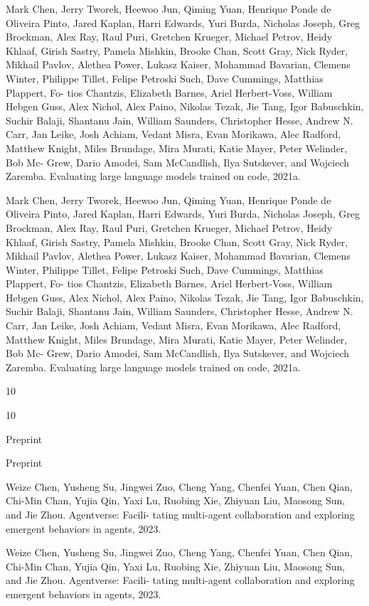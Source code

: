 \documentclass[12pt]{article}
\begin{document}
Mark Chen, Jerry Tworek, Heewoo Jun, Qiming Yuan, Henrique Ponde de Oliveira Pinto, Jared
Kaplan, Harri Edwards, Yuri Burda, Nicholas Joseph, Greg Brockman, Alex Ray, Raul Puri,
Gretchen Krueger, Michael Petrov, Heidy Khlaaf, Girish Sastry, Pamela Mishkin, Brooke Chan,
Scott Gray, Nick Ryder, Mikhail Pavlov, Alethea Power, Lukasz Kaiser, Mohammad Bavarian,
Clemens Winter, Philippe Tillet, Felipe Petroski Such, Dave Cummings, Matthias Plappert, Fo-
tios Chantzis, Elizabeth Barnes, Ariel Herbert-Voss, William Hebgen Guss, Alex Nichol, Alex
Paino, Nikolas Tezak, Jie Tang, Igor Babuschkin, Suchir Balaji, Shantanu Jain, William Saunders,
Christopher Hesse, Andrew N. Carr, Jan Leike, Josh Achiam, Vedant Misra, Evan Morikawa, Alec
Radford, Matthew Knight, Miles Brundage, Mira Murati, Katie Mayer, Peter Welinder, Bob Mc-
Grew, Dario Amodei, Sam McCandlish, Ilya Sutskever, and Wojciech Zaremba. Evaluating large
language models trained on code, 2021a.


Mark Chen, Jerry Tworek, Heewoo Jun, Qiming Yuan, Henrique Ponde de Oliveira Pinto, Jared
Kaplan, Harri Edwards, Yuri Burda, Nicholas Joseph, Greg Brockman, Alex Ray, Raul Puri,
Gretchen Krueger, Michael Petrov, Heidy Khlaaf, Girish Sastry, Pamela Mishkin, Brooke Chan,
Scott Gray, Nick Ryder, Mikhail Pavlov, Alethea Power, Lukasz Kaiser, Mohammad Bavarian,
Clemens Winter, Philippe Tillet, Felipe Petroski Such, Dave Cummings, Matthias Plappert, Fo-
tios Chantzis, Elizabeth Barnes, Ariel Herbert-Voss, William Hebgen Guss, Alex Nichol, Alex
Paino, Nikolas Tezak, Jie Tang, Igor Babuschkin, Suchir Balaji, Shantanu Jain, William Saunders,
Christopher Hesse, Andrew N. Carr, Jan Leike, Josh Achiam, Vedant Misra, Evan Morikawa, Alec
Radford, Matthew Knight, Miles Brundage, Mira Murati, Katie Mayer, Peter Welinder, Bob Mc-
Grew, Dario Amodei, Sam McCandlish, Ilya Sutskever, and Wojciech Zaremba. Evaluating large
language models trained on code, 2021a.


10


10


Preprint


Preprint


Weize Chen, Yusheng Su, Jingwei Zuo, Cheng Yang, Chenfei Yuan, Chen Qian, Chi-Min Chan,
Yujia Qin, Yaxi Lu, Ruobing Xie, Zhiyuan Liu, Maosong Sun, and Jie Zhou. Agentverse: Facili-
tating multi-agent collaboration and exploring emergent behaviors in agents, 2023.


Weize Chen, Yusheng Su, Jingwei Zuo, Cheng Yang, Chenfei Yuan, Chen Qian, Chi-Min Chan,
Yujia Qin, Yaxi Lu, Ruobing Xie, Zhiyuan Liu, Maosong Sun, and Jie Zhou. Agentverse: Facili-
tating multi-agent collaboration and exploring emergent behaviors in agents, 2023.
\end{document}
